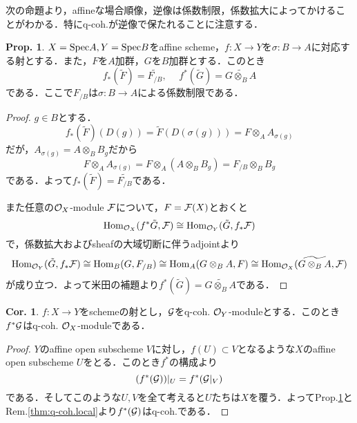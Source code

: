 \documentclass[dvipdfmx,b5paper,papersize]{jsarticle}
\theoremstyle{definition}
\newtheorem{prop}[thm]{Prop.}
\newtheorem{cor}[thm]{Cor.}
\begin{document}
次の命題より，affineな場合順像，逆像は係数制限，係数拡大によってかけることがわかる．特にq-coh.が逆像で保たれることに注意する．
\begin{prop}\label{thm:associated}
  $X={\rm Spec}{A},Y={\rm Spec}{B}$をaffine scheme，$f:X \to Y$を$\sigma:B \to A$に対応する射とする．また，$F$を$A$加群，$G$を$B$加群とする．このとき
  \[
    f_*({\tilde F})={\widetilde {F_{/B}}}, \hspace{15pt} f^*({\tilde G})={\widetilde {G \otimes_B A}}
  \]
  である．ここで${F_{/B}}$は$\sigma:B \to A$による係数制限である．
\end{prop}
\begin{proof}
  $g \in B$とする．
  \[
    f_*({\tilde F})(D(g))={\tilde F}(D(\sigma(g)))=F\otimes_A A_{\sigma(g)}
  \]
  だが，$A_{\sigma(g)}=A\otimes_B B_g$だから
  \[
    F\otimes_A A_{\sigma(g)}=F\otimes_A (A\otimes_B B_g)=F_{/B}\otimes_B B_g
  \]
  である．よって$f_*({\tilde F})={\widetilde {F_{/B}}}$である．

  また任意の${\cal{O}}_X$-module ${\cal{F}}$について，$F={\cal{F}}(X)$とおくと
  \[
    {\rm Hom}_{{\cal{O}}_X}(f^*{\tilde G},{\cal{F}})\cong {\rm Hom}_{{\cal{O}}_Y}({\tilde G},f_*{{\cal{F}}})
  \]
  で，係数拡大およびsheafの大域切断に伴うadjointより
  \[
    {\rm Hom}_{{\cal{O}}_Y}({\tilde G},f_*{{\cal{F}}})\cong {\rm Hom}_{B}(G,F_{/B})\cong {\rm Hom}_{A}(G\otimes_B A,F)\cong {\rm Hom}_{{\cal{O}}_X}({\widetilde {G \otimes_B A}},{\cal{F}})
  \]
  が成り立つ．よって米田の補題より$f^*({\tilde G})={\widetilde {G \otimes_B A}}$である．
\end{proof}
\begin{cor}\label{thm:invese_q-coh.}
  $f:X\to Y$をschemeの射とし，$\cal{G}$をq-coh. ${\cal{O}}_Y$-moduleとする．このとき$f^*{\cal{G}}$はq-coh. ${\cal{O}}_X$-moduleである．
\end{cor}
\begin{proof}
  $Y$のaffine open subscheme $V$に対し，$f(U) \subset V$となるような$X$のaffine open subscheme $U$をとる．このとき$f^*$の構成より
  \[
    (f^*({\cal{G}}))|_U=f^*({\cal{G}}|_V)
  \]
  である．そしてこのような$U,V$を全て考えると$U$たちは$X$を覆う．よってProp.\ref{thm:associated}とRem.\ref{thm:q-coh.local}より$f^*({\cal{G}})$はq-coh.である．

\end{proof}
\end{document}
